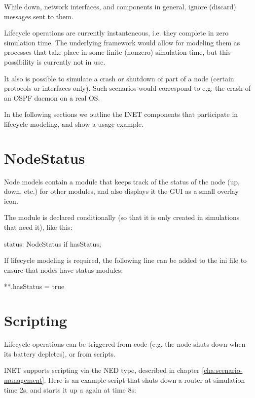 While down, network interfaces, and components in general, ignore (discard)
messages sent to them.

Lifecycle operations are currently instanteneous, i.e. they complete in 
zero simulation time. The underlying framework would allow for modeling 
them as processes that take place in some finite (nonzero) simulation time, 
but this possibility is currently not in use.

It also is possible to simulate a crash or shutdown of part of a node 
(certain protocols or interfaces only). Such scenarios would correspond
to e.g. the crash of an OSPF daemon on a real OS.

In the following sections we outline the INET components that
participate in lifecycle modeling, and show a usage example.

\section{NodeStatus}

Node models contain a  module that keeps track of 
the status of the node (up, down, etc.) for other modules, and also 
displays it the GUI as a small overlay icon.

The  module is declared conditionally (so that it is
only created in simulations that need it), like this:

\begin{ned}
status: NodeStatus if hasStatus;
\end{ned}

If lifecycle modeling is required, the following line can be added to the ini
file to ensure that nodes have status modules:

\begin{inifile}
**.hasStatus = true
\end{inifile}

\section{Scripting}

Lifecycle operations can be triggered from code (e.g. the node shuts down
when its battery depletes), or from scripts.

INET supports scripting via the  NED type, 
described in chapter \ref{cha:scenario-management}.
Here is an example script that shuts down a router at simulation
time 2s, and starts it up a again at time 8s:

